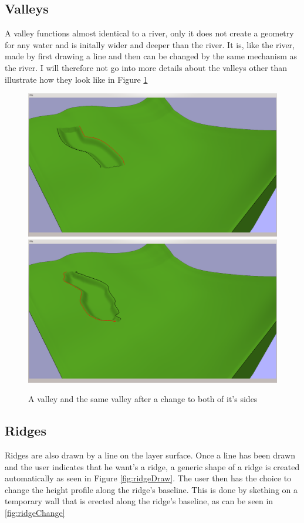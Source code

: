 \documentclass[a4paper,12pt]{report}
\begin{document}
\subsection{Valleys}
A valley functions almost identical to a river, only it does not create a geometry for any water and is initally wider and deeper than the river. It is, like the river, made by first drawing a line and then can be changed by the same mechanism as the river. I will therefore not go into more details about the valleys other than illustrate how they look like in Figure \ref{fig:valley}
\begin{figure}
\includegraphics[trim = 10mm 80mm 200mm 30mm, clip,width=.5\linewidth]{thesis/results/valleyMade.png}
\includegraphics[trim = 10mm 80mm 200mm 30mm, clip,width=.5\linewidth]{thesis/results/valleyChanged.png}
 \caption{A valley and the same valley after a change to both of it's sides }
 \label{fig:valley}
\end{figure}

\subsection{Ridges}
Ridges are also drawn by a line on the layer surface. Once a line has been drawn and the user indicates that he want's a ridge, a generic shape of a ridge is created automatically as seen in Figure \ref{fig:ridgeDraw}. The user then has the choice to change the height profile along the ridge's baseline. This is done by skething on a temporary wall that is erected along the ridge's baseline, as can be seen in \ref{fig:ridgeChange}
\end{document}
